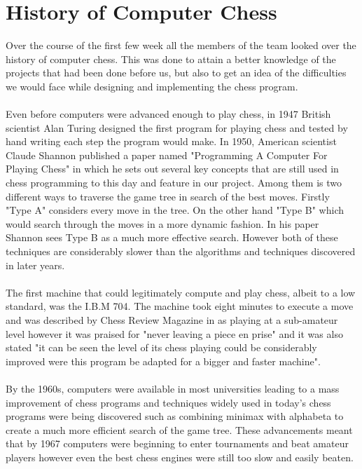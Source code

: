 \documentclass{l3proj}
\begin{document}
\section{History of Computer Chess}

	Over the course of the first few week all the members of the team looked over the history of computer chess. This was done to attain a better knowledge of the projects that had been done before us, but also to get an idea of the difficulties we would face while designing and implementing the chess program. \\\\
	Even before computers were advanced enough to play chess, in 1947 British scientist Alan Turing designed the first program for playing chess and tested by hand writing each step the program would make.\cite{MuseumOrigins} In 1950, American scientist Claude Shannon published a paper named "Programming A Computer For Playing Chess" in which he sets out several key concepts that are still used in chess programming to this day and feature in our project. Among them is two different ways to traverse the game tree in search of the best moves. Firstly "Type A" considers every move in the tree. On the other hand "Type B" which would search through the moves in a more dynamic fashion. \cite{ProgrammingPlaying} In his paper Shannon sees Type B as a much more effective search. However both of these techniques are considerably slower than the algorithms and techniques discovered in later years. \\\\
	The first machine that could legitimately compute and play chess, albeit to a low standard, was the I.B.M 704. The machine took eight minutes to execute a move and was described by Chess Review Magazine in as playing at a sub-amateur level however it was praised for
 "never leaving a piece en prise" and it was also stated "it can be seen the level of its chess playing could be considerably improved were this program be adapted for a bigger and faster machine". \cite{IBM704} \\\\
	By the 1960s, computers were available in most universities leading to a mass improvement of chess programs and techniques widely used in today's chess programs were being discovered such as combining minimax with alphabeta to create a much more efficient search of the game tree. These advancements meant that by 1967 computers were beginning to enter tournaments and beat amateur players \cite{MuseumGoing} however even the best chess engines were still too slow and easily beaten.  \\\\
\end{document}
